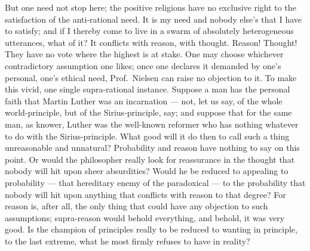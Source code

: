 \documentclass[12pt,a4paper]{book}
\newcommand{\opage}[1]{\marginnote{\footnotesize\textit{[#1]}}}
\begin{document}
But one need not stop here; the positive religions have no exclusive right to
the satisfaction of the anti-rational need. It is my need and nobody else's
that I have to satisfy; and if I thereby come to live in a swarm of absolutely
heterogeneous utterances, what of it? It conflicts with reason, with thought.
Reason! Thought! They have no vote where the highest is at stake. One may
choose whichever contradictory assumption one likes; once one declares it
demanded by one's personal, one's ethical need, Prof.\ Nielsen can raise no
objection to it. To make this vivid, one single supra-rational instance.
Suppose a man has the personal faith that Martin Luther was an incarnation ---
not, let us say, of the
\opage{37}whole world-principle, but of the Sirius-principle, say; and suppose
that for the same man, as knower, Luther was the well-known reformer who has
nothing whatever to do with the Sirius-principle. What good will it do then to
call such a thing unreasonable and unnatural? Probability and reason have
nothing to say on this point. Or would the philosopher really look for
reassurance in the thought that nobody will hit upon sheer absurdities? Would
he be reduced to appealing to probability --- that hereditary enemy of the
paradoxical --- to the probability that nobody will hit upon anything that
conflicts with reason to that degree? For reason is, after all, the only thing
that could have any objection to such assumptions; supra-reason would behold
everything, and behold, it was very good. Is the champion of principles really
to be reduced to wanting in principle, to the last extreme, what he most firmly
refuses to have in reality?
\end{document}
